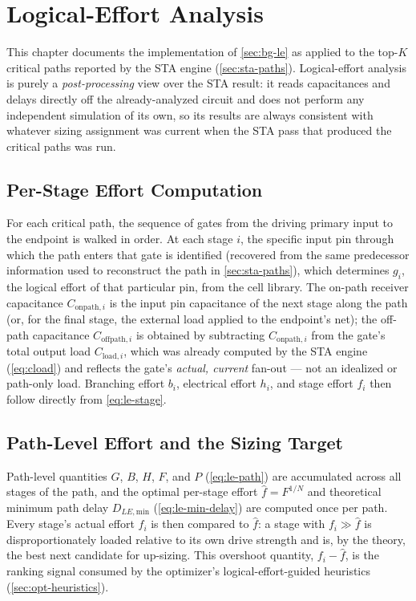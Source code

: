 \chapter{Logical-Effort Analysis}
\label{ch:logical-effort}

This chapter documents the implementation of \cref{sec:bg-le} as applied to
the top-$K$ critical paths reported by the STA engine
(\cref{sec:sta-paths}). Logical-effort analysis is purely a
\emph{post-processing} view over the STA result: it reads capacitances and
delays directly off the already-analyzed circuit and does not perform any
independent simulation of its own, so its results are always consistent
with whatever sizing assignment was current when the STA pass that produced
the critical paths was run.

\section{Per-Stage Effort Computation}
\label{sec:le-stage}

For each critical path, the sequence of gates from the driving primary
input to the endpoint is walked in order. At each stage $i$, the specific
input pin through which the path enters that gate is identified (recovered
from the same predecessor information used to reconstruct the path in
\cref{sec:sta-paths}), which determines $g_i$, the logical effort of that
particular pin, from the cell library. The on-path receiver capacitance
$C_{\mathrm{onpath},i}$ is the input pin capacitance of the next stage along
the path (or, for the final stage, the external load applied to the
endpoint's net); the off-path capacitance $C_{\mathrm{offpath},i}$ is
obtained by subtracting $C_{\mathrm{onpath},i}$ from the gate's total output
load $C_{\mathrm{load},i}$, which was already computed by the STA engine
(\cref{eq:cload}) and reflects the gate's \emph{actual, current} fan-out ---
not an idealized or path-only load. Branching effort $b_i$, electrical
effort $h_i$, and stage effort $f_i$ then follow directly from
\cref{eq:le-stage}.

\section{Path-Level Effort and the Sizing Target}
\label{sec:le-path}

Path-level quantities $G$, $B$, $H$, $F$, and $P$
(\cref{eq:le-path}) are accumulated across all stages of the path, and the
optimal per-stage effort $\hat f = F^{1/N}$ and theoretical minimum path
delay $D_{LE,\mathrm{min}}$ (\cref{eq:le-min-delay}) are computed once per
path. Every stage's actual effort $f_i$ is then compared to $\hat f$: a
stage with $f_i \gg \hat f$ is disproportionately loaded relative to its own
drive strength and is, by the theory, the best next candidate for
up-sizing. This overshoot quantity, $f_i - \hat f$, is the ranking signal
consumed by the optimizer's logical-effort-guided heuristics
(\cref{sec:opt-heuristics}).


